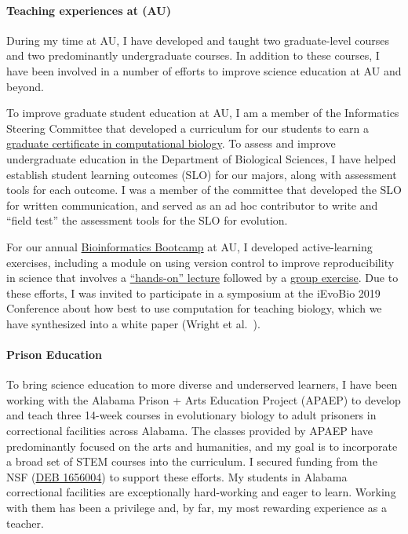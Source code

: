\paragraph*{Teaching experiences at (AU)}
During my time at AU,
I have developed and taught two graduate-level courses
and two predominantly undergraduate courses.
In addition to these courses, I have been involved in a number of efforts to
improve science education at AU and beyond.

To improve graduate student education at AU,
I am a member of the Informatics Steering Committee that developed a
curriculum for our students to earn a
\href{http://bulletin.auburn.edu/thegraduateschool/graduatedegreesoffered/biologicalsciencesmsphd_major/computationalbiology_gradcert/}{graduate certificate in computational biology}.
To assess and improve undergraduate education in the Department of Biological
Sciences, I have helped establish student learning outcomes (SLO) for our
majors, along with assessment tools for each outcome.
I was a member of the committee that developed the SLO for written
communication, and served as an ad hoc contributor to write and ``field test''
the assessment tools for the SLO for evolution.

For our annual
\href{http://www.auburn.edu/cosam/bioinformatics/}{Bioinformatics Bootcamp}
at AU,
I developed active-learning exercises,
including a module on using version control to improve reproducibility in
science that involves a
\href{http://phyletica.org/slides/git-intro/}{``hands-on'' lecture}
followed by a
\href{https://github.com/joaks1/au-bootcamp-git-intro}{group exercise}.
Due to these efforts, I was invited to participate in a symposium at the
iEvoBio 2019 Conference about how best to use computation for teaching biology,
which we have synthesized into a
white paper
(Wright et al.\ \citeyear{Wright2019}).

\paragraph*{Prison Education}
To bring science education to more diverse and underserved learners,
I have been working with
the Alabama Prison + Arts Education Project (APAEP) to develop and teach three
14-week courses in evolutionary biology to adult prisoners in correctional
facilities across Alabama.
The classes provided by APAEP have predominantly focused on the
arts and humanities, and
my
goal is to incorporate a broad set of STEM courses into the
curriculum.
I secured funding from the NSF
(\href{https://www.nsf.gov/awardsearch/showAward?AWD_ID=1656004&HistoricalAwards=false}{DEB 1656004})
to support these efforts.
My students in Alabama correctional facilities are exceptionally hard-working
and eager to learn.
Working with them has been a privilege and, by far, my most rewarding
experience as a teacher.

